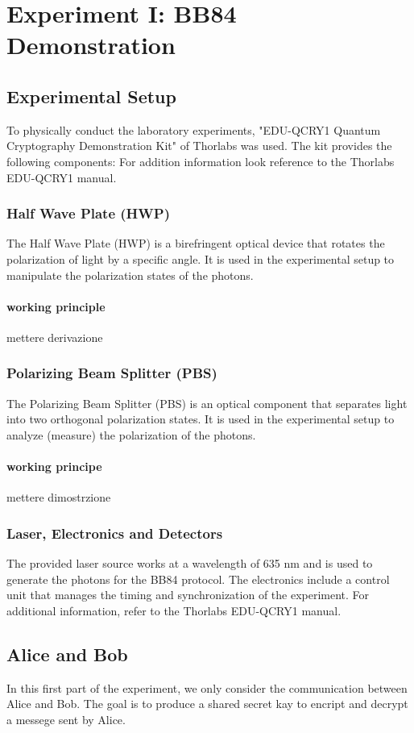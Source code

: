 \chapter {Experiment I: BB84 Demonstration}

\section{Experimental Setup}


To physically conduct the laboratory experiments, "EDU-QCRY1 Quantum Cryptography Demonstration Kit" of Thorlabs was used. The kit provides the following components:
For addition information look reference to the Thorlabs EDU-QCRY1 manual.


\subsection{Half Wave Plate (HWP)}
The Half Wave Plate (HWP) is a birefringent optical device that rotates the polarization of light by a specific angle. It is used in the experimental setup to manipulate the polarization states of the photons.

\subsubsection{working principle} 
mettere derivazione

\subsection{Polarizing Beam Splitter (PBS)}
The Polarizing Beam Splitter (PBS) is an optical component that separates light into two orthogonal polarization states. It is used in the experimental setup to analyze (measure) the polarization of the photons.
\subsubsection{working principe}
mettere dimostrzione 

\subsection{Laser, Electronics and Detectors}
The provided laser source works at a wavelength of 635 nm and is used to generate the photons for the BB84 protocol. The electronics include a control unit that manages the timing and synchronization of the experiment. For additional information, refer to the Thorlabs EDU-QCRY1 manual.


\section{Alice and Bob}
In this first part of the experiment, we only consider the communication between Alice and Bob. The goal is to produce a shared secret kay to encript and decrypt a messege sent by Alice.
